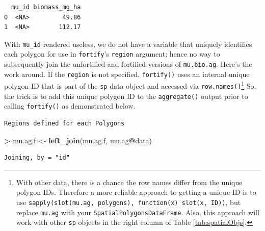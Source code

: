 \documentclass[]{krantz}
\makeatletter
\newenvironment{Shaded}{\begin{snugshade}}{\end{snugshade}}
\newcommand{\ErrorTok}[1]{\textcolor[rgb]{0.14,0.14,0.14}{\textbf{#1}}}
\newcommand{\KeywordTok}[1]{\textcolor[rgb]{0.27,0.27,0.27}{\textbf{#1}}}
\newcommand{\NormalTok}[1]{#1}
\newcommand{\OperatorTok}[1]{\textcolor[rgb]{0.43,0.43,0.43}{\textbf{#1}}}
\newcommand{\StringTok}[1]{\textcolor[rgb]{0.5,0.5,0.5}{#1}}
\newenvironment{kframe}{%
\medskip{}
\setlength{\fboxsep}{.8em}
 \def\at@end@of@kframe{}%
 \ifinner\ifhmode%
  \def\at@end@of@kframe{\end{minipage}}%
  \begin{minipage}{\columnwidth}%
 \fi\fi%
 \def\FrameCommand##1{\hskip\@totalleftmargin \hskip-\fboxsep
 \colorbox{shadecolor}{##1}\hskip-\fboxsep
     \hskip-\linewidth \hskip-\@totalleftmargin \hskip\columnwidth}%
 \MakeFramed {\advance\hsize-\width
   \@totalleftmargin\z@ \linewidth\hsize
   \@setminipage}}%
 {\par\unskip\endMakeFramed%
 \at@end@of@kframe}
\renewenvironment{Shaded}{\begin{kframe}}{\end{kframe}}
\makeatother
\begin{document}
\begin{verbatim}
  mu_id biomass_mg_ha
0  <NA>         49.86
1  <NA>        112.17
\end{verbatim}

With \texttt{mu\_id} rendered useless, we do not have a variable that uniquely identifies each polygon for use in \texttt{fortify}'s \texttt{region} argument; hence no way to subsequently join the unfortified and fortified versions of \texttt{mu.bio.ag}. Here's the work around. If the \texttt{region} is not specified, \texttt{fortify()} uses an internal unique polygon ID that is part of the \texttt{sp} data object and accessed via \texttt{row.names()}\footnote{With other data, there is a chance the row names differ from the unique polygon IDs. Therefore a more reliable approach to getting a unique ID is to use \texttt{sapply(slot(mu.ag,\ \textquotesingle{}polygons\textquotesingle{}),\ function(x)\ slot(x,\ \textquotesingle{}ID\textquotesingle{}))}, but replace \texttt{mu.ag} with your \texttt{SpatialPolygonsDataFrame}. Also, this approach will work with other \texttt{sp} objects in the right column of Table \ref{tab:spatialObjs}.} So, the trick is to add this unique polygon ID to the \texttt{aggregate()} output prior to calling \texttt{fortify()} as demonstrated below.

\begin{Shaded}
\end{Shaded}

\begin{verbatim}
Regions defined for each Polygons
\end{verbatim}

\begin{Shaded}
\begin{Highlighting}[]
\OperatorTok{>}\StringTok{ }\NormalTok{mu.ag.f <-}\StringTok{ }\KeywordTok{left_join}\NormalTok{(mu.ag.f, mu.ag}\OperatorTok{@}\NormalTok{data)}
\end{Highlighting}
\end{Shaded}

\begin{verbatim}
Joining, by = "id"
\end{verbatim}
\end{document}
